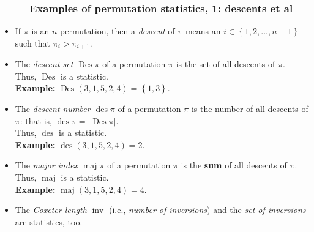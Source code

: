 \documentclass{beamer}
\newcommand{\Des}{\operatorname{Des}}
\newcommand{\des}{\operatorname{des}}
\newcommand{\maj}{\operatorname{maj}}
\newcommand{\fti}[1]{\frametitle{\ \ \ \ \ #1}}
\newcommand{\set}[1]{\left\{ #1 \right\}}
\newcommand{\abs}[1]{\left| #1 \right|}
\newcommand{\tup}[1]{\left( #1 \right)}
\newcommand{\defn}[1]{{\color{darkred}\emph{#1}}} %
\theoremstyle{plain}
\begin{document}
\begin{frame}
\fti{Examples of permutation statistics, 1: descents et al}

\begin{itemize}

\item If $\pi$ is an $n$-permutation, then a \defn{descent} of $\pi$
      means an $i \in \set{1, 2, \ldots, n-1}$ such that
      $\pi_i > \pi_{i+1}$.

\item The \defn{descent set $\Des \pi$} of a permutation $\pi$ is
      the set of all descents of $\pi$. \\
      Thus, \defn{$\Des$} is a statistic. \\
      \textbf{Example:} $\Des \tup{3, 1, 5, 2, 4} = \set{1, 3}$.

\pause

\item The \defn{descent number $\des \pi$} of a permutation $\pi$
      is the number of all descents of $\pi$: that is,
      $\des \pi = \abs{\Des \pi}$. \\
      Thus, \defn{$\des$} is a statistic. \\
      \textbf{Example:} $\des \tup{3, 1, 5, 2, 4} = 2$.

\pause

\item The \defn{major index $\maj \pi$} of a permutation $\pi$
      is the \textbf{sum} of all descents of $\pi$. \\
      Thus, \defn{$\maj$} is a statistic. \\
      \textbf{Example:} $\maj \tup{3, 1, 5, 2, 4} = 4$.

\pause

\item The \defn{Coxeter length} $\operatorname{inv}$
      (i.e., \defn{number of inversions})
      and the \defn{set of inversions} are statistics, too.

\end{itemize}
\end{frame}
\end{document}
